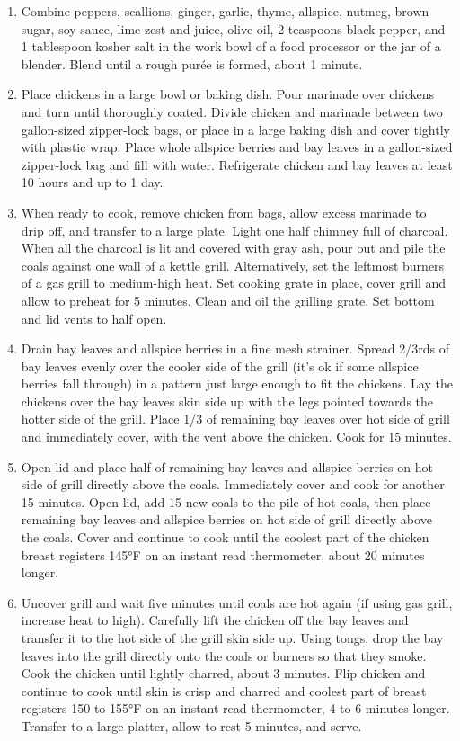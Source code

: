 \documentclass[]{article}
\begin{document}
\begin{enumerate}
\def\labelenumi{\arabic{enumi}.}
\item
  Combine peppers, scallions, ginger, garlic, thyme, allspice, nutmeg, brown sugar, soy sauce, lime zest and juice, olive oil, 2 teaspoons black pepper, and 1 tablespoon kosher salt in the work bowl of a food processor or the jar of a blender. Blend until a rough purée is formed, about 1 minute.
\item
  Place chickens in a large bowl or baking dish. Pour marinade over chickens and turn until thoroughly coated. Divide chicken and marinade between two gallon-sized zipper-lock bags, or place in a large baking dish and cover tightly with plastic wrap. Place whole allspice berries and bay leaves in a gallon-sized zipper-lock bag and fill with water. Refrigerate chicken and bay leaves at least 10 hours and up to 1 day.
\item
  When ready to cook, remove chicken from bags, allow excess marinade to drip off, and transfer to a large plate. Light one half chimney full of charcoal. When all the charcoal is lit and covered with gray ash, pour out and pile the coals against one wall of a kettle grill. Alternatively, set the leftmost burners of a gas grill to medium-high heat. Set cooking grate in place, cover grill and allow to preheat for 5 minutes. Clean and oil the grilling grate. Set bottom and lid vents to half open.
\item
  Drain bay leaves and allspice berries in a fine mesh strainer. Spread 2/3rds of bay leaves evenly over the cooler side of the grill (it's ok if some allspice berries fall through) in a pattern just large enough to fit the chickens. Lay the chickens over the bay leaves skin side up with the legs pointed towards the hotter side of the grill. Place 1/3 of remaining bay leaves over hot side of grill and immediately cover, with the vent above the chicken. Cook for 15 minutes.
\item
  Open lid and place half of remaining bay leaves and allspice berries on hot side of grill directly above the coals. Immediately cover and cook for another 15 minutes. Open lid, add 15 new coals to the pile of hot coals, then place remaining bay leaves and allspice berries on hot side of grill directly above the coals. Cover and continue to cook until the coolest part of the chicken breast registers 145°F on an instant read thermometer, about 20 minutes longer.
\item
  Uncover grill and wait five minutes until coals are hot again (if using gas grill, increase heat to high). Carefully lift the chicken off the bay leaves and transfer it to the hot side of the grill skin side up. Using tongs, drop the bay leaves into the grill directly onto the coals or burners so that they smoke. Cook the chicken until lightly charred, about 3 minutes. Flip chicken and continue to cook until skin is crisp and charred and coolest part of breast registers 150 to 155°F on an instant read thermometer, 4 to 6 minutes longer. Transfer to a large platter, allow to rest 5 minutes, and serve.
\end{enumerate}
\end{document}
